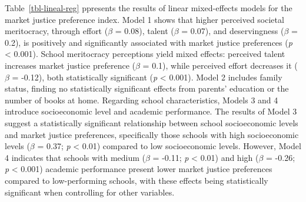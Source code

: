 \documentclass[
  12pt,
  letterpaper,
]{article}
\begin{document}
Table~\ref{tbl-lineal-reg} ppresents the results of linear mixed-effects
models for the market justice preference index. Model 1 shows that
higher perceived societal meritocracy, through effort (\(\beta\) =
0.08), talent (\(\beta\) = 0.07), and deservingness (\(\beta\) = 0.2),
is positively and significantly associated with market justice
preferences (\emph{p} \textless{} 0.001). School meritocracy perceptions
yield mixed effects: perceived talent increases market justice
preference (\(\beta\) = 0.1), while perceived effort decreases it
(\(\beta\) = -0.12), both statistically significant (\emph{p}
\textless{} 0.001). Model 2 includes family status, finding no
statistically significant effects from parents' education or the number
of books at home. Regarding school characteristics, Models 3 and 4
introduce socioeconomic level and academic performance. The results of
Model 3 suggest a statistically significant relationship between school
socioeconomic levels and market justice preferences, specifically those
schools with high socioeconomic levels (\(\beta\) = 0.37; \emph{p}
\textless{} 0.01) compared to low socioeconomic levels. However, Model 4
indicates that schools with medium (\(\beta\) = -0.11; \emph{p}
\textless{} 0.01) and high (\(\beta\) = -0.26; \emph{p} \textless{}
0.001) academic performance present lower market justice preferences
compared to low-performing schools, with these effects being
statistically significant when controlling for other variables.
\end{document}
